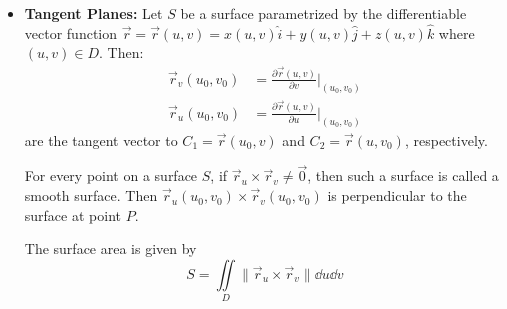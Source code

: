\begin{itemize}
\begin{example}
    \end{example}
    \item \textbf{Tangent Planes:} Let $S$ be a surface parametrized by the differentiable vector function $\vec{r}=\vec{r}(u,v)=x(u,v)\hat{i}+y(u,v)\hat{j} + z(u,v)\hat{k}$ where $(u,v) \in D.$ Then: 
    \begin{align}
        \vec{r}_v(u_0,v_0) &= \frac{\partial \vec{r}(u,v)}{\partial v}\bigg|_{(u_0,v_0)} \\ 
        \vec{r}_u(u_0,v_0) &= \frac{\partial \vec{r}(u,v)}{\partial u}\bigg|_{(u_0,v_0)}
    \end{align}
    are the tangent vector to $C_1 = \vec{r}(u_0,v)$ and $C_2=\vec{r}(u,v_0)$, respectively.
    \begin{definition}
        For every point on a surface $S$, if $\vec{r}_u\times \vec{r}_v \neq \vec{0}$, then such a surface is called a smooth surface. Then $\vec{r}_u(u_0,v_0)\times \vec{r}_v(u_0,v_0)$ is perpendicular to the surface at point $P$.
    \end{definition}
    \begin{theorem}
        The surface area is given by 
        \begin{equation}
            S = \iint\limits_D \lVert \vec{r}_u \times \vec{r}_v \rVert \dd{u}\dd{v}
        \end{equation}
    \end{theorem}
\end{itemize}